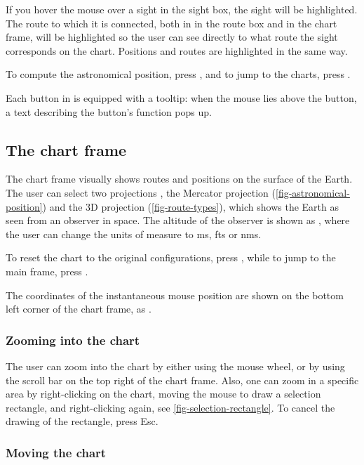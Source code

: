 \documentclass{ol-softwaremanual}
\begin{document}
If you hover the mouse over a sight in the sight box, the sight will be highlighted. The route to which it is connected, both in in the route box and in the chart frame, will be highlighted so the user can see directly to what route the sight corresponds on the chart. Positions and routes are highlighted in the same way. 


To compute the astronomical position, press , and to jump to the charts, press . 

Each button in \thel is equipped with a tooltip: when the mouse lies above the button, a text describing the button's function pops up. 


\subsection{The chart frame}\label{section-chart-frame}

The chart frame visually shows  routes and positions on the surface of the Earth. 
The user can select two projections \cite{bowditch2002the}, the Mercator projection (\cref{fig-astronomical-position}) and the 3D projection (\cref{fig-route-types}), which shows the Earth as seen from an observer in space. The altitude of the observer is shown as , where the user can change the units of measure to \acp{m}, \acp{ft} or \acp{nm}. 

To reset the chart to the original configurations, press , while to jump to the main frame, press . 

The coordinates of the instantaneous mouse position are shown on the bottom left corner of the chart frame, as . 


\subsubsection{Zooming into the chart} The user can zoom into the chart by either using the mouse wheel, or by using the scroll bar on the top right of the chart frame. Also, one can zoom in a specific area by right-clicking on the chart, moving the mouse to draw a selection rectangle, and right-clicking again, see \cref{fig-selection-rectangle}. To cancel the drawing of the rectangle, press Esc. 

\subsubsection{Moving the chart}
\end{document}
